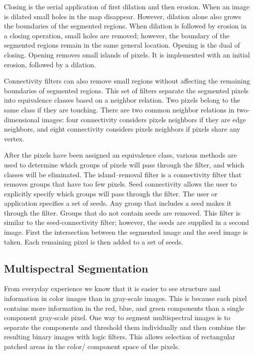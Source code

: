 Closing is the serial application of first dilation and then erosion. When an image is dilated small holes in the map disappear. However, dilation alone also grows the boundaries of the segmented regions. When dilation is followed by erosion in a closing operation, small holes are removed; however, the boundary of the segmented regions remain in the same general location. Opening is the dual of closing. Opening removes small islands of pixels. It is implemented with an initial erosion, followed by a dilation.

Connectivity filters can also remove small regions without affecting the remaining boundaries of segmented regions. This set of filters separate the segmented pixels into equivalence classes based on a neighbor relation. Two pixels belong to the same class if they are touching. There are two common neighbor relations in two-dimensional images: four connectivity considers pixels neighbors if they are edge neighbors, and eight connectivity considers pixels neighbors if pixels share any vertex.

After the pixels have been assigned an equivalence class, various methods are used to determine which groups of pixels will pass through the filter, and which classes will be eliminated. The island--removal filter is a connectivity filter that removes groups that have too few pixels. Seed connectivity allows the user to explicitly specify which groups will pass through the filter. The user or application specifies a set of seeds. Any group that includes a seed makes it through the filter. Groups that do not contain seeds are removed. This filter is similar to the seed-connectivity filter; however, the seeds are supplied in a second image. First the intersection between the segmented image and the seed image is taken. Each remaining pixel is then added to a set of seeds.

\subsection{Multispectral Segmentation}

From everyday experience we know that it is easier to see structure and information in color images than in gray-scale images. This is because each pixel contains more information in the red, blue, and green components than a single component gray-scale pixel. One way to segment multispectral images is to separate the components and threshold them individually and then combine the resulting binary images with logic filters. This allows selection of rectangular patched areas in the color/ component space of the pixels.

